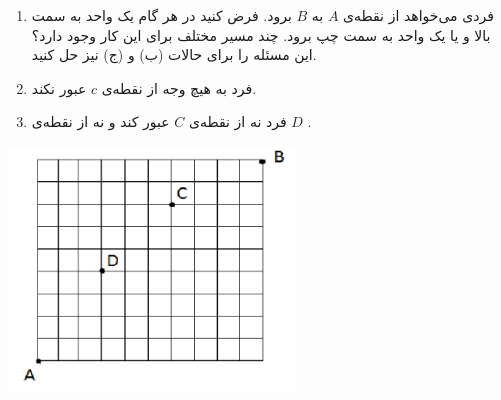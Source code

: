 \EXERCISE
\begin{enumerate}
\item
فردی می‌خواهد از نقطه‌ی
$A$
به
$B$
برود. فرض کنید در هر گام یک واحد به سمت بالا و یا یک واحد به سمت چپ برود. چند مسیر مختلف برای این کار وجود دارد؟ این مسئله را برای حالات (ب) و (ج) نیز حل کنید.
\item
فرد به هیچ وجه از نقطه‌ی
$c$
عبور نکند.
\item
فرد نه از نقطه‌ی
$C$
عبور کند و نه از نقطه‌ی
$D$
.
\end{enumerate}
\begin{center}
\includegraphics[height=6.5cm]{26.png}
\end{center}